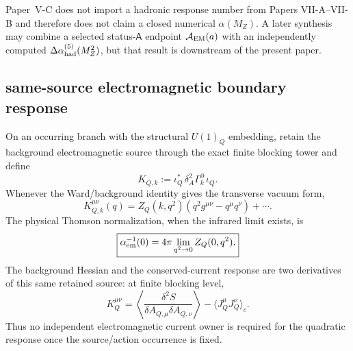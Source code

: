 \documentclass[12pt,a4paper]{article}
\newcommand{\Aem}{\mathcal A_{\rm EM}}
\begin{document}
\begin{corollary}
\label{p7v2:cor:no-alpha-mz}
Paper~V-C does not import a hadronic response number from Papers VII-A--VII-B and
therefore does not claim a closed numerical \(\alpha(M_Z)\).  A later synthesis
may combine a selected status-\(\mathsf A\) endpoint \(\Aem(a)\) with an
independently computed
\(\Delta\alpha_{\rm had}^{(5)}(M_Z^2)\), but that result is downstream of the
present paper.
\end{corollary}

\label{p7v2:part:qcd-ew}

\subsection{same-source electromagnetic boundary response}
\label{p7v2:sec:v2141-em-boundary-response}

\begin{theorem}
\label{p7v2:thm:v2141-em-same-source-hessian}
On an occurring branch with the structural $U(1)_Q$ embedding, retain the
background electromagnetic source through the exact finite blocking tower and
define
\begin{equation}
\label{p7v2:eq:v2141-KQ}
 K_{Q,k}:=\iota_Q^*\,\delta_A^2\Gamma_k^{\partial}\,\iota_Q .
\end{equation}
Whenever the Ward/background identity gives the transverse vacuum form,
\begin{equation}
\label{p7v2:eq:v2141-ZQ}
 \boxed{
 K_{Q,k}^{\mu\nu}(q)
 =Z_Q(k,q^2)(q^2g^{\mu\nu}-q^\mu q^\nu)+\cdots .}
\end{equation}
The physical Thomson normalization, when the infrared limit exists, is
\begin{equation}
\label{p7v2:eq:v2141-alpha-thomson}
 \boxed{
 \alpha_{\rm em}^{-1}(0)
 =4\pi\lim_{q^2\to0}Z_Q(0,q^2).}
\end{equation}
The background Hessian and the conserved-current response are two derivatives
of this same retained source: at finite blocking level,
\begin{equation}
\label{p7v2:eq:v2141-current-hessian}
 \boxed{
 K_Q^{\mu\nu}
 =\left\langle\frac{\delta^2S}{\delta A_{Q,\mu}\delta A_{Q,\nu}}\right\rangle
 -\langle J_Q^\mu J_Q^\nu\rangle_c .}
\end{equation}
Thus no independent electromagnetic current owner is required for the
quadratic response once the source/action occurrence is fixed.
\end{theorem}
\end{document}
